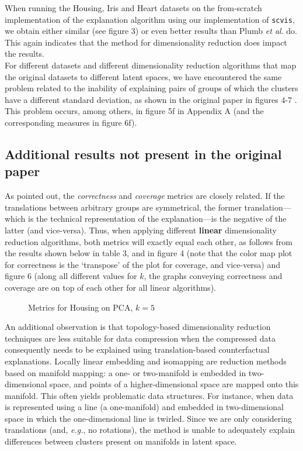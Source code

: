 When running the Housing, Iris and Heart datasets on the from-scratch implementation of the explanation algorithm using our implementation of \texttt{scvis}, we obtain either similar (see figure 3) or even better results than Plumb \textit{et al}. do. This again indicates that the method for dimensionality reduction does impact the results.\\

For different datasets and different dimensionality reduction algorithms that map the original datasets to different latent spaces, we have encountered the same problem related to the inability of explaining pairs of groups of which the clusters have a different standard deviation, as shown in the original paper in figures 4-7 \citep[p.~4]{plumb2020explaining}. This problem occurs, among others, in figure 5f in Appendix A (and the corresponding measures in figure 6f).

\subsection{Additional results not present in the original paper}

As \citep[p.~6]{plumb2020explaining} pointed out, the \textit{correctness} and \textit{coverage} metrics are closely related. If the translations between arbitrary groups are symmetrical, the former translation---which is the technical representation of the explanation---is the negative of the latter (and vice-versa). Thus, when applying different \textbf{linear} dimensionality reduction algorithms, both metrics will exactly equal each other, as follows from the results shown below in table 3, and in figure 4 (note that the color map plot for correctness is the `transpose' of the plot for coverage, and vice-versa) and figure 6 (along all different values for $k$, the graphs conveying correctness and coverage are on top of each other for all linear algorithms).\\
\begin{figure}
  \scalebox{0.12}{}
  \caption{Metrics for Housing on PCA, $k = 5$}
\end{figure}

An additional observation is that topology-based dimensionality reduction techniques are less suitable for data compression when the compressed data consequently needs to be explained using translation-based counterfactual explanations. Locally linear embedding and isomapping are reduction methods based on manifold mapping: a one- or two-manifold is embedded in two-dimensional space, and points of a higher-dimensional space are mapped onto this manifold. This often yields problematic data structures. For instance, when data is represented using a line (a one-manifold) and embedded in two-dimensional space in which the one-dimensional line is twirled. Since we are only considering translations (and, \textit{e.g.}, no rotations), the method is unable to adequately explain differences between clusters present on manifolds in latent space.\\

